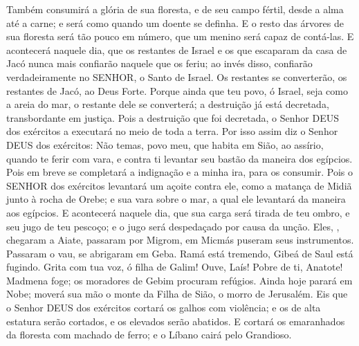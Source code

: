 {  Também consumirá a glória de sua floresta, e de seu campo fértil, desde a alma até a carne; e será como quando um doente se definha.
  E o resto das árvores de sua floresta será tão pouco em número, que um menino será capaz de contá-las.
  E acontecerá naquele dia, que os restantes de Israel e os que escaparam da casa de Jacó nunca mais confiarão naquele que os feriu; ao invés disso, confiarão verdadeiramente no SENHOR, o Santo de Israel.
  Os restantes se converterão, os restantes de Jacó, ao Deus Forte.
  Porque ainda que teu povo, ó Israel, seja como a areia do mar,
{} o restante dele se converterá; a destruição já está decretada, transbordante em justiça.
  Pois a destruição que foi decretada, o Senhor DEUS dos exércitos a executará no meio de toda a terra.
  Por isso assim diz o Senhor DEUS dos exércitos: Não temas, povo meu, que habita em Sião, ao assírio, quando te ferir com vara, e contra ti levantar seu bastão da maneira dos egípcios.
  Pois em breve se completará a indignação e a minha ira, para os consumir.
  Pois o SENHOR dos exércitos levantará um açoite contra ele, como a matança de Midiã junto à rocha de Orebe; e sua vara
{} sobre o mar, a qual ele levantará da maneira
{} aos egípcios.
  E acontecerá naquele dia, que sua carga será tirada de teu ombro, e seu jugo de teu pescoço; e o jugo será despedaçado por causa da unção.
  Eles,
{}, chegaram a Aiate, passaram por Migrom, em Micmás puseram seus instrumentos.
  Passaram o vau, se abrigaram em Geba. Ramá está tremendo, Gibeá de Saul está fugindo.
  Grita com tua voz, ó filha de Galim! Ouve, Laís! Pobre de ti, Anatote!
  Madmena foge; os moradores de Gebim procuram refúgios.
  Ainda hoje parará em Nobe; moverá sua mão
{} o monte da Filha de Sião, o morro de Jerusalém.
  Eis que o Senhor DEUS dos exércitos cortará os galhos com violência; e os de alta estatura serão cortados, e os elevados serão abatidos.
  E cortará os emaranhados da floresta com machado de ferro; e o Líbano cairá pelo Grandioso.
\par }

